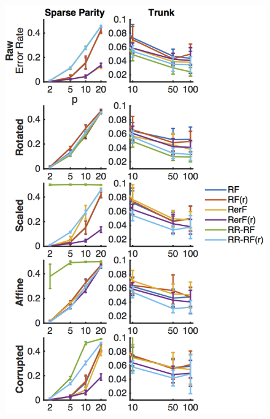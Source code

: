 \documentclass[simplex.tex]{subfiles}
\begin{document}
\begin{figure}[h!]
\begin{cframed}
\centering
\includegraphics[height=0.5\textheight]{./figs/RefF1.png}

\end{cframed}
\end{figure}
\end{document}
